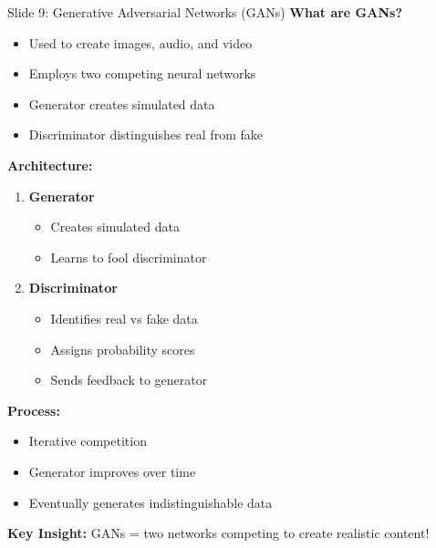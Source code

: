 \documentclass[8pt]{beamer}
\begin{document}
	\begin{frame}{Slide 9: Generative Adversarial Networks (GANs)}
		\fontsize{6.5}{7.5}\selectfont
		\textbf{What are GANs?}
		\begin{itemize}
			\item Used to create images, audio, and video
			\item Employs two competing neural networks
			\item Generator creates simulated data
			\item Discriminator distinguishes real from fake
		\end{itemize}
		
		\vspace{0.1cm}
		\textbf{Architecture:}
		\begin{enumerate}
			\item \textbf{Generator}
			\begin{itemize}
				\item Creates simulated data
				\item Learns to fool discriminator
			\end{itemize}
			\item \textbf{Discriminator}
			\begin{itemize}
				\item Identifies real vs fake data
				\item Assigns probability scores
				\item Sends feedback to generator
			\end{itemize}
		\end{enumerate}
		
		\vspace{0.1cm}
		\textbf{Process:}
		\begin{itemize}
			\item Iterative competition
			\item Generator improves over time
			\item Eventually generates indistinguishable data
		\end{itemize}
		
		\textcolor{myblue}{\textbf{Key Insight:}} GANs = two networks competing to create realistic content!
	\end{frame}
	
\end{document}
